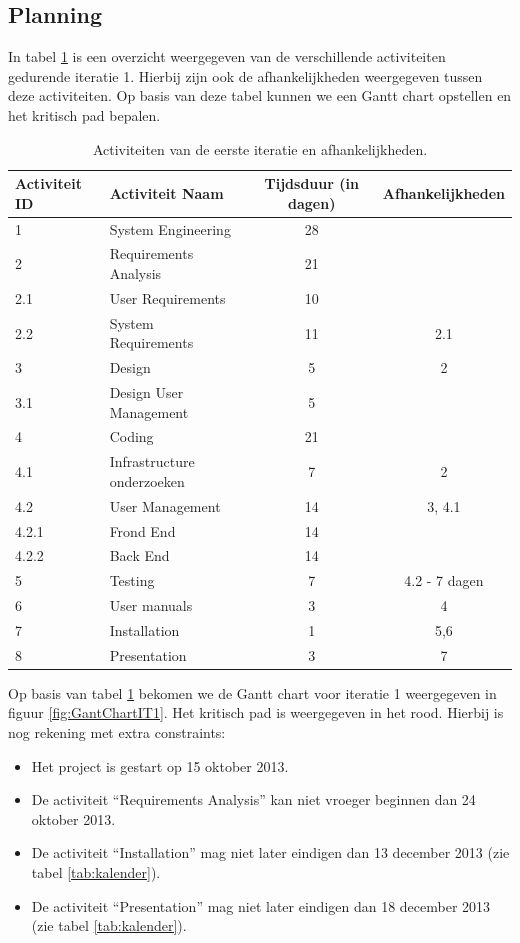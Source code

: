 \subsection{Planning}
In tabel \ref{tab:ActivityDependenciesIteratie1} is een overzicht weergegeven van de verschillende activiteiten gedurende iteratie 1. Hierbij zijn ook de afhankelijkheden weergegeven tussen deze activiteiten. Op basis van deze tabel kunnen we een Gantt chart opstellen en het kritisch pad bepalen.
\begin{table} [H]
	\centering
	\caption{Activiteiten van de eerste iteratie en afhankelijkheden.}
	\begin{tabular} {l|l|c|c}
		Activiteit ID & Activiteit Naam & Tijdsduur (in dagen) & Afhankelijkheden \\
		\hline
		1 	& System Engineering 		& 28 & \\
		2 	& Requirements Analysis 	& 21 & \\
		2.1 & User Requirements 		& 10 & \\
		2.2 & System Requirements 		& 11 & 2.1 \\
		3 	& Design 					& 5 & 2 \\
		3.1 & Design User Management 	& 5 & \\
		4 	& Coding 					& 21 & \\
		4.1 & Infrastructure onderzoeken & 7 & 2\\
		4.2 & User Management			& 14 & 3, 4.1  \\
		4.2.1 & Frond End 		 		& 14 & \\
		4.2.2 & Back End				& 14 & \\
		5 	& Testing 					& 7 & 4.2 - 7 dagen \\
		6 	& User manuals 				& 3 & 4 \\
		7 	& Installation 				& 1 & 5,6 \\
		8 	& Presentation 				& 3 & 7	
	\end{tabular}
	\label{tab:ActivityDependenciesIteratie1}
\end{table}
Op basis van tabel \ref{tab:ActivityDependenciesIteratie1} bekomen we de Gantt chart voor iteratie 1 weergegeven in figuur \ref{fig:GantChartIT1}. Het kritisch pad is weergegeven in het rood. Hierbij is nog rekening met extra constraints:
\begin{itemize}
	\item Het project is gestart op 15 oktober 2013.
	\item De activiteit ``Requirements Analysis'' kan niet vroeger beginnen dan 24 oktober 2013.
	\item De activiteit ``Installation'' mag niet later eindigen dan 13 december 2013 (zie tabel \ref{tab:kalender}).
	\item De activiteit ``Presentation'' mag niet later eindigen dan 18 december 2013 (zie tabel \ref{tab:kalender}).
\end{itemize}
